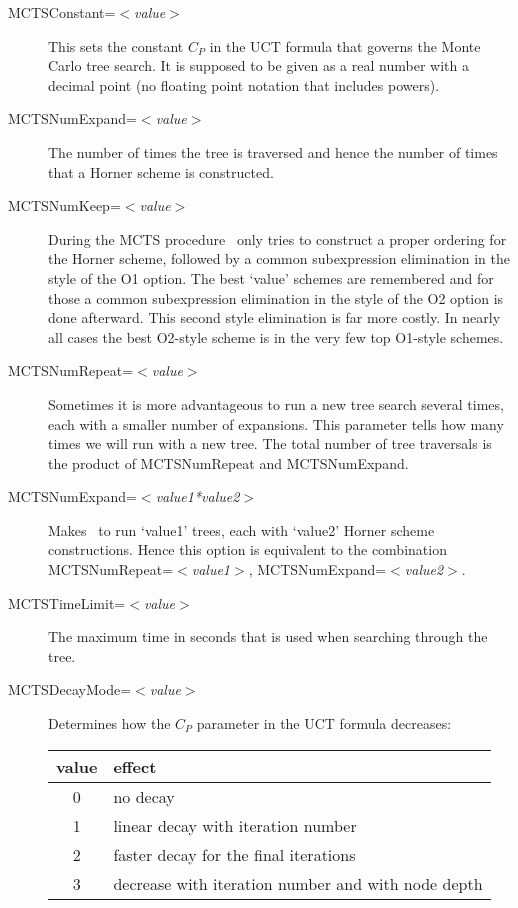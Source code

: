 \begin{description}
\item[MCTSConstant=$<$\emph{value}$>$] 
  This sets the constant $C_P$ in the UCT formula that governs 
  the Monte Carlo tree search. It is supposed to be given as a real number 
  with a decimal point (no floating point notation that includes powers).
\item[MCTSNumExpand=$<$\emph{value}$>$] The number of times the tree
  is traversed and hence the number of times that a Horner scheme is
  constructed.
\item[MCTSNumKeep=$<$\emph{value}$>$] 
  During the MCTS procedure \FORM\ only tries to construct 
  a proper ordering for the Horner scheme, followed by a common subexpression 
  elimination in the style of the O1 option. The best `value' schemes are 
  remembered and for those a common subexpression elimination in the style of 
  the O2 option is done afterward. This second style elimination is far more 
  costly. In nearly all cases the best O2-style scheme is in the very few top 
  O1-style schemes.
\item[MCTSNumRepeat=$<$\emph{value}$>$] 
  Sometimes it is more advantageous to run
  a new tree search several times, each with a smaller number of
  expansions. This parameter tells how many times we will run with a
  new tree. The total number of tree traversals is the product of 
  MCTSNumRepeat and MCTSNumExpand.
\item[MCTSNumExpand=$<$\emph{value1*value2}$>$] 
  Makes \FORM\ to run `value1' trees, each with `value2' Horner scheme
  constructions. Hence this option is equivalent to the combination \hfill \\
  MCTSNumRepeat=$<$\emph{value1}$>$, MCTSNumExpand=$<$\emph{value2}$>$.
\item[MCTSTimeLimit=$<$\emph{value}$>$] The maximum time in seconds
  that is used when searching through the tree.
\item[MCTSDecayMode=$<$\emph{value}$>$] Determines how the $C_P$ parameter
in the UCT formula decreases:

\begin{center}
\begin{tabular}{|c|l|}
\hline
value & effect\\
\hline
0 & no decay\\
1 & linear decay with iteration number\\
2 & faster decay for the final iterations\\
3 & decrease with iteration number and with node depth\\
\hline
\end{tabular}
\end{center}
\end{description}

